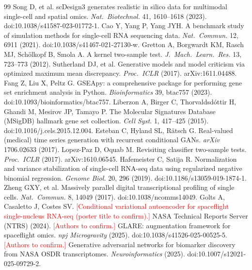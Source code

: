 \documentclass[11pt]{article}
\newcommand{\res}[1]{\textcolor{red}{[#1]}}
\begin{document}
\begin{thebibliography}{99}
 Song D, et al. scDesign3 generates realistic in silico data for multimodal single-cell and spatial omics. \textit{Nat.\ Biotechnol.} 41, 1610--1618 (2023). doi:10.1038/s41587-023-01772-1.
 Cao Y, Yang P, Yang JYH. A benchmark study of simulation methods for single-cell RNA sequencing data. \textit{Nat.\ Commun.} 12, 6911 (2021). doi:10.1038/s41467-021-27130-w.
 Gretton A, Borgwardt KM, Rasch MJ, Sch\"olkopf B, Smola A. A kernel two-sample test. \textit{J.\ Mach.\ Learn.\ Res.} 13, 723--773 (2012).
 Sutherland DJ, et al. Generative models and model criticism via optimized maximum mean discrepancy. \textit{Proc.\ ICLR} (2017). arXiv:1611.04488.
 Fang Z, Liu X, Peltz G. GSEApy: a comprehensive package for performing gene set enrichment analysis in Python. \textit{Bioinformatics} 39, btac757 (2023). doi:10.1093/bioinformatics/btac757.
 Liberzon A, Birger C, Thorvaldsd\'ottir H, Ghandi M, Mesirov JP, Tamayo P. The Molecular Signatures Database (MSigDB) hallmark gene set collection. \textit{Cell Syst.} 1, 417--425 (2015). doi:10.1016/j.cels.2015.12.004.
 Esteban C, Hyland SL, R\"atsch G. Real-valued (medical) time series generation with recurrent conditional GANs. \textit{arXiv} 1706.02633 (2017).
 Lopez-Paz D, Oquab M. Revisiting classifier two-sample tests. \textit{Proc.\ ICLR} (2017). arXiv:1610.06545.
 Hafemeister C, Satija R. Normalization and variance stabilization of single-cell RNA-seq data using regularized negative binomial regression. \textit{Genome Biol.} 20, 296 (2019). doi:10.1186/s13059-019-1874-1.
 Zheng GXY, et al. Massively parallel digital transcriptional profiling of single cells. \textit{Nat.\ Commun.} 8, 14049 (2017). doi:10.1038/ncomms14049.
 Golts A, Casaletto J, Costes SV. \res{Conditional variational autoencoder for spaceflight single-nucleus RNA-seq (poster title to confirm).} NASA Technical Reports Server (NTRS) (2024).
 \res{Authors to confirm.} GLARE: augmentation framework for spaceflight omics. \textit{npj Microgravity} (2025). doi:10.1038/s41526-025-00525-5.
 \res{Authors to confirm.} Generative adversarial networks for biomarker discovery from NASA OSDR transcriptomes. \textit{Neuroinformatics} (2025). doi:10.1007/s12021-025-09729-2.
\end{thebibliography}
\end{document}
